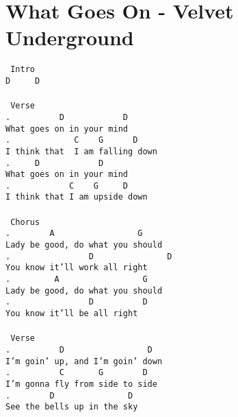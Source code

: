 \newpage
\section{What Goes On - Velvet Underground}
\label{What Goes On - Velvet Underground}
\texttt{\lbrack\ Intro\rbrack\\
D\ \ \ \ \ D\ \ \ \ \\
\\
\lbrack\ Verse\rbrack\\
.\ \ \ \ \ \ \ \ \ \ D\ \ \ \ \ \ \ \ \ \ \ \ D\\
What\ goes\ on\ in\ your\ mind\\
.\ \ \ \ \ \ \ \ \ \ \ \ \ C\ \ \ \ G\ \ \ \ \ \ D\\
I\ think\ that\ \ I\ am\ falling\ down\\
.\ \ \ \ \ D\ \ \ \ \ \ \ \ \ \ \ \ D\\
What\ goes\ on\ in\ your\ mind\\
.\ \ \ \ \ \ \ \ \ \ \ \ C\ \ \ \ G\ \ \ \ \ D\\
I\ think\ that\ I\ am\ upside\ down\\
\\
\lbrack\ Chorus\rbrack\\
.\ \ \ \ \ \ \ \ A\ \ \ \ \ \ \ \ \ \ \ \ \ \ \ \ \ G\\
Lady\ be\ good,\ do\ what\ you\ should\\
.\ \ \ \ \ \ \ \ \ \ \ \ \ \ \ \ D\ \ \ \ \ \ \ \ \ \ \ \ \ \ \ D\\
You\ know\ it'll\ work\ all\ right\\
.\ \ \ \ \ \ \ \ \ A\ \ \ \ \ \ \ \ \ \ \ \ \ \ \ \ \ G\\
Lady\ be\ good,\ do\ what\ you\ should\\
.\ \ \ \ \ \ \ \ \ \ \ \ \ \ \ \ D\ \ \ \ \ \ \ \ \ \ D\ \\
You\ know\ it'll\ be\ all\ right\\
\\
\lbrack\ Verse\rbrack\\
.\ \ \ \ \ \ \ \ \ \ D\ \ \ \ \ \ \ \ \ \ \ \ \ \ \ \ \ D\\
I'm\ goin'\ up,\ and\ I'm\ goin'\ down\\
.\ \ \ \ \ \ \ \ \ \ C\ \ \ \ \ \ \ G\ \ \ \ \ \ \ \ D\\
I'm\ gonna\ fly\ from\ side\ to\ side\\
.\ \ \ \ \ \ \ \ D\ \ \ \ \ \ \ \ \ \ \ \ \ \ \ D\\
See\ the\ bells\ up\ in\ the\ sky\\
}
